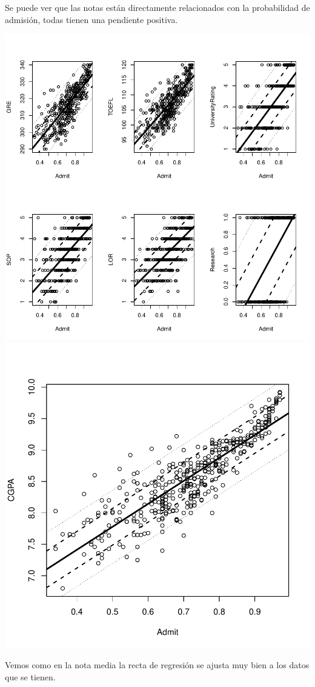 \documentclass [a4paper] {article}
\begin{document}
Se puede ver que las notas están directamente relacionados con la probabilidad de admisión, todas tienen una pendiente positiva.
\begin{center}
\includegraphics{entrega-analisis_grades_plot_1}
\includegraphics{entrega-analisis_grades_plot_2}
\end{center}
Vemos como en la nota media la recta de regresión se ajusta muy bien a los datos que se tienen.
\end{document}
